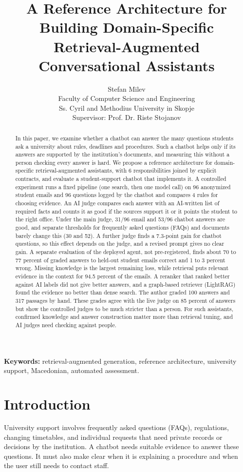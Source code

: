 \documentclass[a4paper,10pt,twocolumn]{article}
\title{A Reference Architecture for Building Domain-Specific Retrieval-Augmented Conversational Assistants}
\author{Stefan Milev\\\small Faculty of Computer Science and Engineering\\\small Ss. Cyril and Methodius University in Skopje\\\small Supervisor: Prof. Dr. Riste Stojanov}
\date{}
\begin{document}
\maketitle
\begin{abstract}
In this paper, we examine whether a chatbot can answer the many questions students ask a university about rules, deadlines and procedures. Such a chatbot helps only if its answers are supported by the institution's documents, and measuring this without a person checking every answer is hard. We propose a reference architecture for domain-specific retrieval-augmented assistants, with 6 responsibilities joined by explicit contracts, and evaluate a student-support chatbot that implements it. A controlled experiment runs a fixed pipeline (one search, then one model call) on 96 anonymized student emails and 96 questions logged by the chatbot and compares 4 rules for choosing evidence. An AI judge compares each answer with an AI-written list of required facts and counts it as good if the sources support it or it points the student to the right office. Under the main judge, 31/96 email and 53/96 chatbot answers are good, and separate thresholds for frequently asked questions (FAQs) and documents barely change this (30 and 52). A further judge finds a 7.3-point gain for chatbot questions, so this effect depends on the judge, and a revised prompt gives no clear gain. A separate evaluation of the deployed agent, not pre-registered, finds about 70 to 77 percent of graded answers to held-out student emails correct and 1 to 3 percent wrong. Missing knowledge is the largest remaining loss, while retrieval puts relevant evidence in the context for 94.5 percent of the emails. A reranker that ranked better against AI labels did not give better answers, and a graph-based retriever (LightRAG) found the evidence no better than dense search. The author graded 100 answers and 317 passages by hand. These grades agree with the live judge on 85 percent of answers but show the controlled judges to be much stricter than a person. For such assistants, confirmed knowledge and answer construction matter more than retrieval tuning, and AI judges need checking against people.
\end{abstract}
\par\noindent\textbf{Keywords:} retrieval-augmented generation, reference architecture, university support, Macedonian, automated assessment.

\section{Introduction}
University support involves frequently asked questions (FAQs), regulations, changing timetables, and individual requests that need private records or decisions by the institution. A chatbot needs suitable evidence to answer these questions. It must also make clear when it is explaining a procedure and when the user still needs to contact staff.
\end{document}
